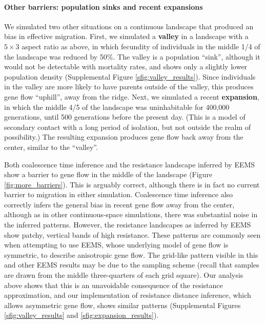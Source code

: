 \documentclass{article}
\begin{document}
\paragraph{Other barriers: population sinks and recent expansions}
We simulated two other situations on a continuous landscape that produced an bias in effective migration.
First, we simulated a \textbf{valley} in a landscape with a $5 \times 3$ aspect ratio as above, 
in which fecundity of individuals in the middle 1/4 of the landscape was reduced by 50\%.
The valley is a population ``sink'',
although it would not be detectable with mortality rates,
and shows only a slightly lower population density (Supplemental Figure \ref{sfig:valley_results}).
Since individuals in the valley are more likely to have parents outside of the valley,
this produces gene flow ``uphill'', away from the ridge.
Next, we simulated a recent \textbf{expansion},
in which the middle 4/5 of the landscape was uninhabitable for 400,000 generations, 
until 500 generations before the present day.
(This is a model of secondary contact with a long period of isolation,
but not outside the realm of possibility.)
The resulting expansion produces gene flow back away from the center,
similar to the ``valley''.

Both coalescence time inference and the resistance landscape inferred by EEMS
show a barrier to gene flow in the middle of the landscape (Figure \ref{fig:more_barriers}).
This is arguably correct, 
although there is in fact no current barrier to migration in either simulation.
Coalescence time inference also correctly infers 
the general bias in recent gene flow away from the center,
although as in other continuous-space simulations, 
there was substantial noise in the inferred patterns.
However, the resistance landscapes as inferred by EEMS show patchy, vertical bands of high resistance.
These patterns are commonly seen when attempting to use EEMS, 
whose underlying model of gene flow is symmetric,
to describe anisotropic gene flow.
The grid-like pattern visible in this and other EEMS results
may be due to the sampling scheme
(recall that samples are drawn from the middle three-quarters of each grid square). 
Our analysis above shows that this is an unavoidable consequence of the resistance approximation,
and our implementation of resistance distance inference,
which allows asymmetric gene flow, shows similar patterns
(Supplemental Figures \ref{sfig:valley_results} and \ref{sfig:expansion_results}).
\end{document}
